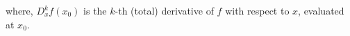 where, $D_x^kf(x_0)$ is the $k$-th (total) derivative of $f$ with respect to $x$, evaluated at $x_0$.






























































































